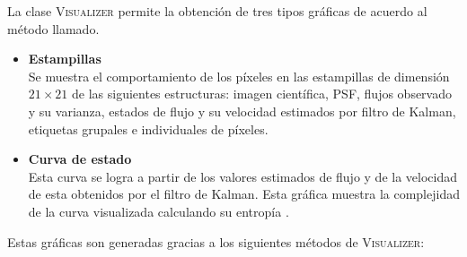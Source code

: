  
La clase \textsc{Visualizer} permite la obtenci\'on de tres tipos gr\'aficas de acuerdo al m\'etodo llamado.
 
\begin{itemize}
  
\item \textbf{Estampillas}\\ 
Se muestra el comportamiento de los p\'ixeles en las estampillas de dimensi\'on $21 \times 21$ de las siguientes estructuras: imagen cient\'ifica, PSF, flujos observado y su varianza, estados de flujo y su velocidad estimados por filtro de Kalman, etiquetas grupales e individuales de p\'ixeles.
\item \textbf{Curva de estado}\\
 Esta curva se logra a partir de los valores estimados de flujo y de la velocidad de esta obtenidos por el filtro de Kalman. Esta gr\'afica muestra la complejidad de la curva visualizada calculando su entrop\'ia \cite{balestrino}.
\end{itemize}

Estas gr\'aficas son generadas gracias a los siguientes m\'etodos de \textsc{Visualizer}:

